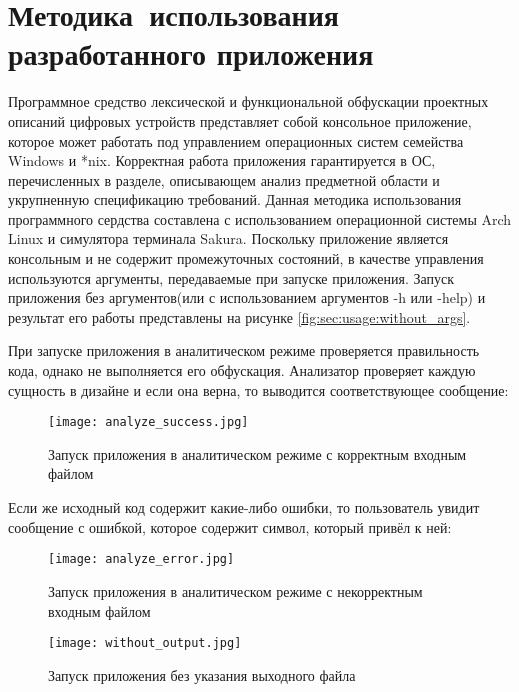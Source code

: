 \section{Методика~использования разработанного приложения}
\label{sec:usage}
Программное средство лексической и функциональной обфускации проектных описаний цифровых устройств представляет собой консольное приложение, которое может работать под управлением операционных систем семейства Windows и *nix. Корректная работа приложения гарантируется в ОС, перечисленных в разделе, описывающем анализ предметной области и укрупненную спецификацию требований. Данная методика использования программного сердства составлена с использованием операционной системы Arch Linux и симулятора терминала Sakura. Поскольку приложение является консольным и не содержит промежуточных состояний, в качестве управления используются аргументы, передаваемые при запуске приложения. Запуск приложения без аргументов(или с использованием аргументов -h или -help) и результат его работы представлены на рисунке \ref{fig:sec:usage:without_args}.

При запуске приложения в аналитическом режиме проверяется правильность кода, однако не выполняется его обфускация. Анализатор проверяет каждую сущность в дизайне и если она верна, то выводится соответствующее сообщение:

\begin{figure}[hbtp]
\centering
  \texttt{[image: analyze\_success.jpg]}
  \caption{ Запуск приложения в аналитическом режиме с корректным входным файлом }
  \label{fig:sec:usage:analyze_success}
\end{figure}


Если же исходный код содержит какие-либо ошибки, то пользователь увидит сообщение с ошибкой, которое содержит символ, который привёл к ней:


\begin{figure}[ht]
\centering
  \texttt{[image: analyze\_error.jpg]}
  \caption{ Запуск приложения в аналитическом режиме с некорректным входным файлом }
  \label{fig:sec:usage:analyze_error}
\end{figure}

\begin{landscape}
\thispagestyle{lscape}
\begin{figure}[ht]
\centering
  \texttt{[image: without\_output.jpg]}
  \caption{ Запуск приложения без указания выходного файла }
  \label{fig:sec:usage:without_output}
\end{figure}
\end{landscape}

\clearpage

